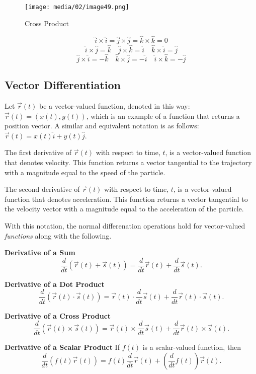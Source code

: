 \documentclass[
]{book}
\begin{document}
\begin{figure}
\centering
\texttt{[image: media/02/image49.png]}
\caption{Cross Product}
\end{figure}

\[\hat{i} \times \hat{i} = \hat{j} \times \hat{j} = \hat{k} \times \hat{k} = 0 \]
\[\hat{i} \times \hat{j} = \hat{k} \quad \hat{j} \times \hat{k} = \hat{i} \quad \hat{k} \times \hat{i} = \hat{j} \]
\[\hat{j} \times \hat{i} = -\hat{k} \quad \hat{k} \times \hat{j} = -\hat{i} \quad \hat{i} \times \hat{k} = -\hat{j} \]

\hypertarget{vector-differentiation}{%
\subsection{Vector Differentiation}\label{vector-differentiation}}

Let \(\vec{r}(t)\) be a vector-valued function, denoted in this way: \(\vec{r}(t) = (x(t),y(t))\), which is an example of a function that returns a position vector. A similar and equivalent notation is as follows: \(\vec{r}(t) = x(t)\hat{i} + y(t)\hat{j}\).

The first derivative of \(\vec{r}(t)\) with respect to time, \(t\), is a vector-valued function that denotes velocity. This function returns a vector tangential to the trajectory with a magnitude equal to the speed of the particle.

The second derivative of \(\vec{r}(t)\) with respect to time, \(t\), is a vector-valued function that denotes acceleration. This function returns a vector tangential to the velocity vector with a magnitude equal to the acceleration of the particle.

With this notation, the normal differenation operations hold for vector-valued \emph{functions} along with the following.

\textbf{Derivative of a Sum}
\[\frac{d}{dt}\left( \vec{r}(t) + \vec{s}(t) \right) = \frac{d}{dt}\vec{r}(t) + \frac{d}{dt}\vec{s}(t).\]

\textbf{Derivative of a Dot Product}
\[\frac{d}{dt}\left( \vec{r}(t) \cdot \vec{s}(t) \right) = \vec{r}(t) \cdot \frac{d}{dt}\vec{s}(t) + \frac{d}{dt}\vec{r}(t) \cdot \vec{s}(t).\]

\textbf{Derivative of a Cross Product}
\[\frac{d}{dt}\left( \vec{r}(t) \times \vec{s}(t) \right) = \vec{r}(t) \times \frac{d}{dt}\vec{s}(t) +  \frac{d}{dt}\vec{r}(t) \times \vec{s}(t).\]

\textbf{Derivative of a Scalar Product}
If \(f(t)\) is a scalar-valued function, then
\[\frac{d}{dt}\left( f(t)\vec{r}(t) \right) = f(t)\frac{d}{dt}\vec{r}(t) + \left(\frac{d}{dt} f(t)\right) \vec{r}(t).\]
\end{document}
